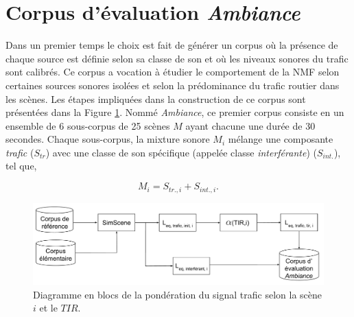\section{Corpus d'évaluation \textit{Ambiance}}
\label{part:corpus_ambiance}
Dans un premier temps le choix est fait de générer un corpus où la présence de chaque source est définie selon sa classe de son et où les niveaux sonores du trafic sont calibrés. Ce corpus a vocation à étudier le comportement de la NMF selon certaines sources sonores isolées et selon la prédominance du trafic routier dans les scènes. Les étapes impliquées dans la construction de ce corpus sont présentées dans la Figure \ref{fig:bloc_diagram_tir}. Nommé \textit{Ambiance}, ce premier corpus consiste en un ensemble de 6 sous-corpus de 25 scènes $M$ ayant chacune une durée de 30 secondes. Chaque sous-corpus, la mixture sonore $M_i$ mélange une composante \textit{trafic} ($S_{tr}$) avec une classe de son spécifique (appelée classe \textit{interférante}) ($S_{int.}$), tel que,  

\begin{equation}
M_i = S_{tr.,i}+S_{int.,i}.
\end{equation}

\begin{figure}[ht]
\centering
\includegraphics[width=.9\linewidth]{./figures/autres/TIR_ambiance.pdf}
\caption{Diagramme en blocs de la pondération du signal trafic selon la scène $i$ et le $TIR$.}
\label{fig:bloc_diagram_tir}
\end{figure}




